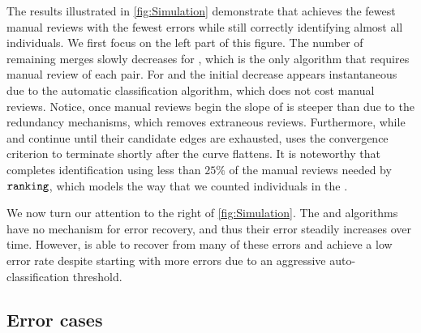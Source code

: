     \Simulation{}

    \Refresh{}

    The results illustrated in \cref{fig:Simulation} demonstrate that  achieves the fewest manual
      reviews with the fewest errors while still correctly identifying almost all individuals.
    We first focus on the left part of this figure.
    The number of remaining merges slowly decreases for , which is the only algorithm that requires
      manual review of each pair.
    For  and  the initial decrease appears instantaneous due to the automatic
      classification algorithm, which does not cost manual reviews.
    Notice, once manual reviews begin the slope of  is steeper than  due to the
      redundancy mechanisms, which removes extraneous reviews.
    Furthermore, while  and  continue until their candidate edges are exhausted,
       uses the convergence criterion to terminate shortly after the curve flattens.
    It is noteworthy that  completes identification using less than $25\percent$ of the manual
      reviews needed by ${\tt{ranking}}$, which models the way that we counted individuals in the \GZC{}.

    We now turn our attention to the right of \cref{fig:Simulation}.
    The  and  algorithms have no mechanism for error recovery, and thus their error
      steadily increases over time.
    However,  is able to recover from many of these errors and achieve a low error rate despite
      starting with more errors due to an aggressive auto-classification threshold.
      
    \subsection{Error cases}

